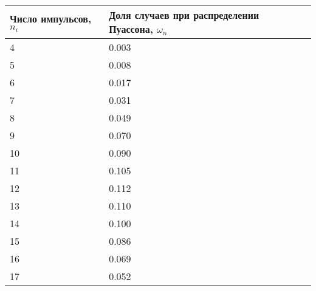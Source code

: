 \documentclass[a4paper]{article}
\begin{document}
\begin{table}[!h]
\begin{center}
\begin{tabular}{|l|l|}
\hline
Число импульсов, $n_{i}$ & Доля случаев при распределении Пуассона, $\omega_{n}$ \\ \hline
4                       & 0.003                                                                                 \\ \hline
5                       & 0.008                                                                                  \\ \hline
6                       & 0.017                                                                                  \\ \hline
7                       & 0.031                                                                                 \\ \hline
8                       & 0.049                                                                                  \\ \hline
9                       & 0.070                                                                                  \\ \hline
10                       & 0.090                                                                                  \\ \hline
11                       & 0.105                                                                                  \\ \hline
12                       & 0.112                                                                                  \\ \hline
13                       & 0.110                                                                                  \\ \hline
14                       & 0.100                                                                                  \\ \hline
15                       & 0.086                                                                                  \\ \hline
16                       & 0.069                                                                                  \\ \hline
17                       & 0.052                                                                                  \\ \hline

\end{tabular}
\end{center}
\end{table}
\end{document}
